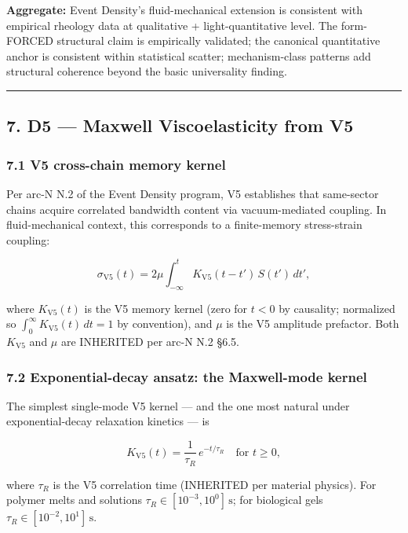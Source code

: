 \documentclass[
  11pt,a4paper]{article}
\begin{document}
\textbf{Aggregate:} Event Density's fluid-mechanical extension is
consistent with empirical rheology data at qualitative +
light-quantitative level. The form-FORCED structural claim is
empirically validated; the canonical quantitative anchor is consistent
within statistical scatter; mechanism-class patterns add structural
coherence beyond the basic universality finding.

\begin{center}\rule{0.5\linewidth}{0.5pt}\end{center}

\subsection{7. D5 --- Maxwell Viscoelasticity from
V5}\label{d5-maxwell-viscoelasticity-from-v5}

\subsubsection{7.1 V5 cross-chain memory
kernel}\label{v5-cross-chain-memory-kernel-1}

Per arc-N N.2 of the Event Density program, V5 establishes that
same-sector chains acquire correlated bandwidth content via
vacuum-mediated coupling. In fluid-mechanical context, this corresponds
to a finite-memory stress-strain coupling:

\[\sigma_\mathrm{V5}(t) = 2\mu \int_{-\infty}^t K_\mathrm{V5}(t - t') \, S(t') \, dt',\]

where \(K_\mathrm{V5}(t)\) is the V5 memory kernel (zero for \(t < 0\)
by causality; normalized so \(\int_0^\infty K_\mathrm{V5}(t)\,dt = 1\)
by convention), and \(\mu\) is the V5 amplitude prefactor. Both
\(K_\mathrm{V5}\) and \(\mu\) are INHERITED per arc-N N.2 §6.5.

\subsubsection{7.2 Exponential-decay ansatz: the Maxwell-mode
kernel}\label{exponential-decay-ansatz-the-maxwell-mode-kernel}

The simplest single-mode V5 kernel --- and the one most natural under
exponential-decay relaxation kinetics --- is

\[K_\mathrm{V5}(t) = \frac{1}{\tau_R} \, e^{-t/\tau_R} \quad \text{for } t \geq 0,\]

where \(\tau_R\) is the V5 correlation time (INHERITED per material
physics). For polymer melts and solutions
\(\tau_R \in [10^{-3}, 10^0]\,\mathrm{s}\); for biological gels
\(\tau_R \in [10^{-2}, 10^1]\,\mathrm{s}\).
\end{document}
